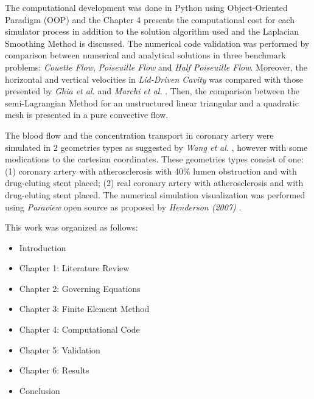 \medskip
The computational development was done in Python \cite{python} 
using Object-Oriented Paradigm (OOP) and the Chapter 4 
presents the computational cost for each simulator process 
in addition to the solution algorithm used
and the Laplacian Smoothing Method is discussed.
The numerical code validation was performed by 
comparison between numerical and analytical solutions 
in three benchmark problems:
\textit{Couette Flow}, \textit{Poiseuille Flow} and 
\textit{Half Poiseuille Flow}. 
Moreover, the horizontal and vertical velocities 
in \textit{Lid-Driven Cavity} was compared with 
those presented by \textit{Ghia et al.} \cite{ghia1982} and \textit{Marchi et al.} \cite{marchi2009}.
Then, the comparison between the semi-Lagrangian Method for 
an unstructured linear triangular and a quadratic mesh 
is presented in a pure convective flow.

\medskip
The blood flow and the concentration transport 
in coronary artery were simulated in 2 geometries 
types as suggested by \textit{Wang et al.} \cite{wang2017}, 
however with some modications to the cartesian coordinates.
These geometries types consist of one:
(1) coronary artery with atherosclerosis with 40\% lumen obstruction 
and with drug-eluting stent placed;
(2) real coronary artery with atherosclerosis and with drug-eluting stent placed.
The numerical simulation visualization was performed using \textit{Paraview} open source as proposed by \textit{Henderson (2007)} \cite{paraview}.


\medskip
\noindent
This work was organized as follows:

\begin{itemize}
 \item Introduction\\[-1cm] 
 \item Chapter 1: Literature Review\\[-1cm]
 \item Chapter 2: Governing Equations\\[-1cm]
 \item Chapter 3: Finite Element Method\\[-1cm]
 \item Chapter 4: Computational Code\\[-1cm]
 \item Chapter 5: Validation\\[-1cm]
 \item Chapter 6: Results\\[-1cm]
 \item Conclusion
\end{itemize}
